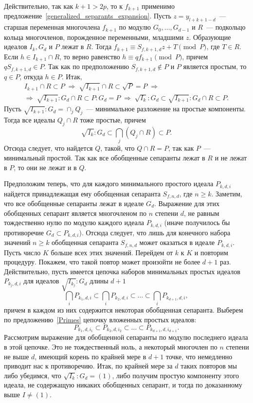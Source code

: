 \documentclass[11pt]{article}
\renewcommand{\ge}{\geqslant}
\theoremstyle{plain}
\theoremstyle{definition}
\theoremstyle{remark}
\begin{document}
Действительно, так как $k+1 > 2p$, то к $f_{k+1}$ применимо предложение~\ref{generalized_separants_expansion}. 
Пусть $z = y_{l+k+1-d}$~--- старшая переменная многочлена $f_{k+1}$ по модулю $G_0, \ldots, G_{d-1}$
и $R$~--- подкольцо кольца многочленов, порожденное переменными, младшими $z$. 
Образующие идеалов $I_k, G_d$ и $P$ лежат в $R$.
Тогда $f_{k+1} \equiv S_{f,k+1,d} z + T \pmod P$, где $T \in R$.
Если $h \in I_{k+1} \cap R$, то верно равенство
$h \equiv q f_{k+1} \pmod P$, причем $q S_{f,k+1,d} \in P$.
Так как по предположению $S_{f,k+1,d} \notin P$ и $P$ является простым, то $q \in P$,
откуда $h \in P$. Итак,
\begin{gather*}
 I_{k+1} \cap R \subset P \; \Longrightarrow \; \sqrt{I_{k+1}} \cap R \subset \sqrt{P} = P \; \Longrightarrow \\
 \Longrightarrow \; \sqrt{I_{k+1}}:G_d \cap R \subset P:G_d = P \; \Longrightarrow \; \sqrt{I_k}:G_d \subset \sqrt{I_{k+1}}:G_d \cap R \subset P.
\end{gather*}
Пусть $\sqrt{I_{k+1}}:G_d = \cap_j Q_j$~--- минимальное разложение на простые компоненты.
Тогда все идеалы $Q_j \cap R$ тоже простые, причем
$$
 \sqrt{I_k}:G_d \subset \bigcap_j \left( Q_j \cap R \right) \subset P.
$$
Отсюда следует, что найдется $Q$, такой, что $Q \cap R = P$, так как $P$~--- минимальный простой.
Так как все обобщенные сепаранты лежат в $R$ и не лежат в $P$, то они не лежат и в $Q$.

\bigskip

Предположим теперь, что для каждого минимального простого идеала $P_{k,d,i}$
найдется принадлежащая ему обобщенная сепаранта $S_{f,n,d}$, где $n \ge k$.
Заметим, что все обобщенные сепаранты лежат в идеале $G_d$.
Выражение для этих обобщенных сепарант является многочленом по $n$ степени $d$,
не равным тождественно нулю по модулю каждого идеала $P_{k,d,i}$ (иначе получилось бы противоречие $G_d \subset P_{k,d,i}$).
Отсюда следует, что лишь для конечного набора значений $n \ge k$ обобщенная сепаранта $S_{f,n,d}$ может оказаться в идеале $P_{k,d,i}$.
Пусть число $K$ больше всех этих значений. Перейдем от $k$ к $K$ и повторим процедуру. Покажем, что такой повтор может произойти не более $d+1$ раз. Действительно, пусть имеется цепочка наборов минимальных простых идеалов $P_{k_j, d, i}$ для идеалов $\sqrt{I_{k_j}}:G_d$ длины $d+1$
$$
 \bigcap_i P_{k_1, d, i} \subset \bigcap_i P_{k_2, d, i} \subset \ldots \subset \bigcap_i P_{k_{d+1}, d, i},
$$
причем в каждом из них содержится некоторая обобщенная сепаранта.
Выберем по предложению~\ref{Primes} цепочку вложенных простых идеалов:
$$
 P_{k_1, d, i_1} \subset P_{k_2, d, i_2} \subset \ldots \subset P_{k_{d+1}, d, i_{d+1}}.
$$
Рассмотрим выражение для обобщенной сепаранты по модулю последнего идеала в этой цепочке. Это не тождественный ноль,
а некоторый многочлен по $n$ степени не выше $d$, имеющий корень по крайней мере в $d+1$ точке, что немедленно приводит нас к противоречию.
Итак, по крайней мере за $d$ таких повторов мы либо убедимся, что $\sqrt{I_k}:G_d = (1)$, либо получим простую компоненту этого идеала, не содержащую никаких обобщенных сепарант, и тогда по доказанному выше $I \ne (1)$.
\end{document}
